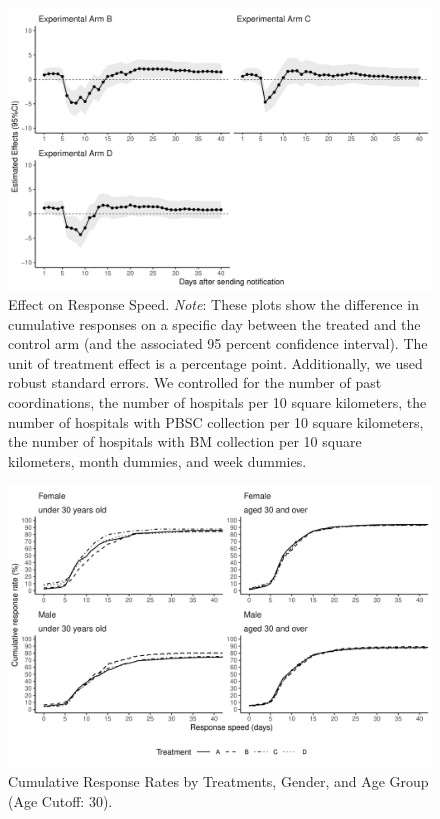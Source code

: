 \documentclass [12pt, a4paper]{article}
\begin{document}
\begin{figure}[H]
\includegraphics{JMDP RCT - Main Document_files/figure-latex/flow-1} \caption{Effect on Response Speed. \newline \emph{Note}: These plots show the difference in cumulative responses on a specific day between the treated and the control arm (and the associated 95 percent confidence interval). The unit of treatment effect is a percentage point. Additionally, we used robust standard errors. We controlled for the number of past coordinations, the number of hospitals per 10 square kilometers, the number of hospitals with PBSC collection per 10 square kilometers, the number of hospitals with BM collection per 10 square kilometers, month dummies, and week dummies.}\label{fig:flow}
\end{figure}

\begin{figure}[H]
\includegraphics{JMDP RCT - Main Document_files/figure-latex/cumulative-response-rate-subset-1} \caption{Cumulative Response Rates by Treatments, Gender, and Age Group (Age Cutoff: 30).}\label{fig:cumulative-response-rate-subset}
\end{figure}
\end{document}

